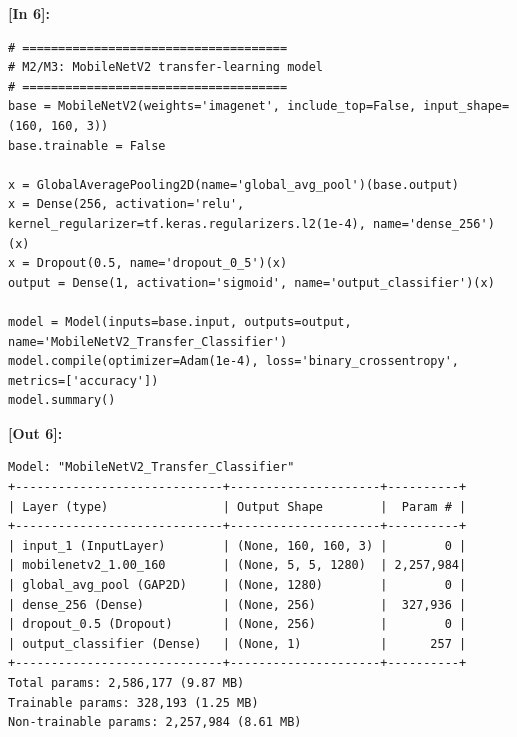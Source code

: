 \vspace{0.6em}
\noindent\textbf{\small [In 6]:}
\begin{lstlisting}[style=pycode]
# =====================================
# M2/M3: MobileNetV2 transfer-learning model
# =====================================
base = MobileNetV2(weights='imagenet', include_top=False, input_shape=(160, 160, 3))
base.trainable = False

x = GlobalAveragePooling2D(name='global_avg_pool')(base.output)
x = Dense(256, activation='relu', kernel_regularizer=tf.keras.regularizers.l2(1e-4), name='dense_256')(x)
x = Dropout(0.5, name='dropout_0_5')(x)
output = Dense(1, activation='sigmoid', name='output_classifier')(x)

model = Model(inputs=base.input, outputs=output, name='MobileNetV2_Transfer_Classifier')
model.compile(optimizer=Adam(1e-4), loss='binary_crossentropy', metrics=['accuracy'])
model.summary()\end{lstlisting}
\noindent\textbf{\small [Out 6]:}
\begin{lstlisting}[style=output]
Model: "MobileNetV2_Transfer_Classifier"
+-----------------------------+---------------------+----------+
| Layer (type)                | Output Shape        |  Param # |
+-----------------------------+---------------------+----------+
| input_1 (InputLayer)        | (None, 160, 160, 3) |        0 |
| mobilenetv2_1.00_160        | (None, 5, 5, 1280)  | 2,257,984|
| global_avg_pool (GAP2D)     | (None, 1280)        |        0 |
| dense_256 (Dense)           | (None, 256)         |  327,936 |
| dropout_0.5 (Dropout)       | (None, 256)         |        0 |
| output_classifier (Dense)   | (None, 1)           |      257 |
+-----------------------------+---------------------+----------+
Total params: 2,586,177 (9.87 MB)
Trainable params: 328,193 (1.25 MB)
Non-trainable params: 2,257,984 (8.61 MB)
\end{lstlisting}

